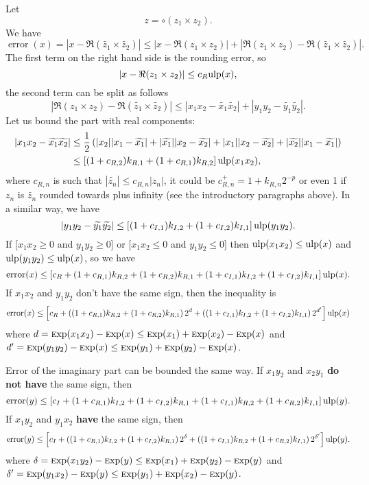 \documentclass {article}
\DeclareMathOperator{\error}{error}
\newcommand {\Ulp}{{\rm ulp}}
\newcommand {\Exp}{{\rm \textsc exp}}
\begin{document}
Let
\[
z=\circ(z_1\times z_2).
\]
We have
\[
\error(x) = |x-\Re(\widetilde{z_1}\times \widetilde{z_2})| \leq
|x-\Re(z_1\times z_2)|
+|\Re(z_1\times z_2)-\Re(\widetilde{z_1}\times\widetilde{z_2})|.
\]
The first term on the right hand side is the rounding error, so
\[
|x-\Re(z_1\times z_2)| \leq c_R \Ulp(x),
\]
the second term can be split as follows
\[
|\Re(z_1\times z_2)-\Re(\widetilde{z_1}\times\widetilde{z_2})| \leq
|x_1x_2-\widetilde{x_1}\widetilde{x_2}|
+|y_1y_2-\widetilde{y_1}\widetilde{y_2}|.
\]
Let us bound the part with real components:
\begin{align*}
|x_1x_2-\widetilde{x_1}\widetilde{x_2}| &\leq
\frac{1}{2}\left(|x_2||x_1-\widetilde{x_1}|
+|\widetilde{x_1}||x_2-\widetilde{x_2}|+|x_1||x_2-\widetilde{x_2}|
+|\widetilde{x_2}||x_1-\widetilde{x_1}|\right)
\\
&\leq \left[(1+c_{R,2})k_{R,1}+(1+c_{R,1})k_{R,2}\right] \Ulp(x_1x_2),
\end{align*}
where $c_{R,n}$ is such that $|\widetilde{z_n}| \leq c_{R,n}|z_n|$, it could
be $c_{R,n}^+=1+k_{R,n}2^{-p}$ or even 1 if $z_n$ is $\widetilde{z_n}$ rounded
towards plus infinity (see the introductory paragraphs above). In a similar
way, we have
\[
|y_1y_2-\widetilde{y_1}\widetilde{y_2}| \leq
\left[(1+c_{I,1})k_{I,2}+(1+c_{I,2})k_{I,1}\right] \Ulp(y_1y_2).
\]
If [$x_1x_2 \geq 0$ and $y_1y_2 \geq 0$] or [$x_1x_2 \leq 0$ and $y_1y_2 \leq
  0$] then $\Ulp(x_1x_2) \leq \Ulp(x)$ and $\Ulp(y_1y_2) \leq \Ulp(x)$, so we
have
\[
\error(x) \leq \left[c_R + (1+c_{R,1})k_{R,2} + (1+c_{R,2})k_{R,1} +
(1+c_{I,1})k_{I,2} + (1+c_{I,2})k_{I,1} \right] \Ulp(x).
\]
If $x_1x_2$ and $y_1y_2$ don't have the same sign, then the inequality is
\[
\error(x) \leq \left[ c_R + \left( (1+c_{R,1})k_{R,2} + (1+c_{R,2})k_{R,1}
\right)2^d + \left( (1+c_{I,1})k_{I,2} + (1+c_{I,2})k_{I,1} \right)2^{d'}
\right] \Ulp(x)
\]
where $d = \Exp(x_1x_2)-\Exp(x) \leq \Exp(x_1)+\Exp(x_2)-\Exp(x)$ and $d' =
\Exp(y_1y_2)-\Exp(x) \leq \Exp(y_1)+\Exp(y_2)-\Exp(x)$.

Error of the imaginary part can be bounded the same way. If $x_1y_2$ and
$x_2y_1$ {\bf do not have} the same sign, then
\[
\error(y) \leq \left[c_I + (1+c_{R,1})k_{I,2} + (1+c_{I,2})k_{R,1} +
(1+c_{I,1})k_{R,2} + (1+c_{R,2})k_{I,1}\right] \Ulp(y).
\]
If $x_1y_2$ and $y_1x_2$ {\bf have} the same sign, then
\[
\error(y) \leq \left[c_I + \left( (1+c_{R,1})k_{I,2} + (1+c_{I,2})k_{R,1}
\right)2^{\delta} + \left( (1+c_{I,1})k_{R,2} + (1+c_{R,2})k_{I,1} \right)
2^{\delta'}\right] \Ulp(y).
\]
where $\delta = \Exp(x_1y_2)-\Exp(y) \leq \Exp(x_1)+\Exp(y_2)-\Exp(y)$ and
$\delta' = \Exp(y_1x_2)-\Exp(y) \leq \Exp(y_1)+\Exp(x_2)-\Exp(y)$.
\end{document}
